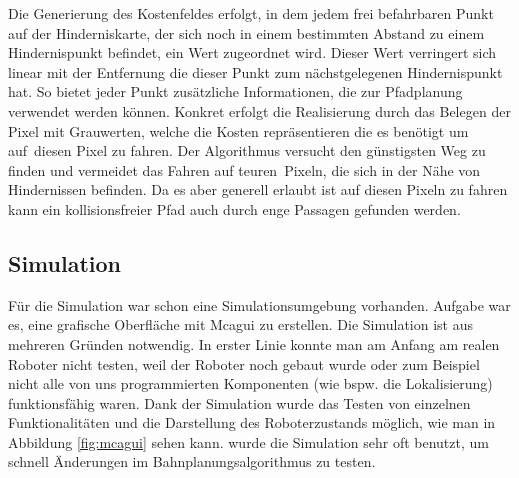 Die Generierung des Kostenfeldes erfolgt, in dem jedem frei befahrbaren Punkt auf der Hinderniskarte, der sich noch in einem bestimmten Abstand zu einem Hindernispunkt befindet, ein Wert zugeordnet wird.
Dieser Wert verringert sich linear mit der Entfernung die dieser Punkt zum nächstgelegenen Hindernispunkt hat. So bietet jeder Punkt zusätzliche Informationen, die zur Pfadplanung verwendet werden können.
Konkret erfolgt die Realisierung durch das Belegen der Pixel mit Grauwerten, welche die Kosten repräsentieren die es benötigt um \glqq auf\grqq\ diesen Pixel zu fahren. Der Algorithmus versucht den günstigsten Weg zu finden und vermeidet das Fahren auf \glqq teuren\grqq\ Pixeln, die sich in der Nähe von Hindernissen befinden. Da es aber generell erlaubt ist auf diesen Pixeln zu fahren kann ein kollisionsfreier Pfad auch durch enge Passagen gefunden werden.



\subsection{Simulation}
\label{simulation_subsec}
\authorsection{\editoroier}

Für die Simulation war schon eine Simulationsumgebung vorhanden.
Aufgabe war es, eine grafische Oberfläche mit Mcagui zu erstellen.
Die Simulation ist aus mehreren Gründen notwendig.
In erster Linie konnte man am Anfang am realen Roboter nicht testen, weil der Roboter noch gebaut wurde oder zum Beispiel nicht alle von uns programmierten Komponenten (wie bspw. die Lokalisierung) funktionsfähig waren.
Dank der Simulation wurde das Testen von einzelnen Funktionalitäten und die Darstellung des Roboterzustands möglich, wie man in Abbildung \ref{fig:mcagui} sehen kann.
\ZB wurde die Simulation sehr oft benutzt, um schnell Änderungen im Bahnplanungsalgorithmus zu testen.

